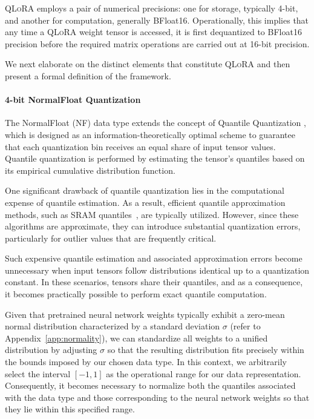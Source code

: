 \textsc{QLoRA} employs a pair of numerical precisions: one for storage, typically 4-bit, and another for computation, generally BFloat16. Operationally, this implies that any time a \textsc{QLoRA} weight tensor is accessed, it is first dequantized to BFloat16 precision before the required matrix operations are carried out at 16-bit precision.

We next elaborate on the distinct elements that constitute \textsc{QLoRA} and then present a formal definition of the framework.

\paragraph{4-bit NormalFloat Quantization} The NormalFloat (NF) data type extends the concept of Quantile Quantization \citep{dettmers2022optimizers}, which is designed as an information-theoretically optimal scheme to guarantee that each quantization bin receives an equal share of input tensor values. Quantile quantization is performed by estimating the tensor's quantiles based on its empirical cumulative distribution function.

One significant drawback of quantile quantization lies in the computational expense of quantile estimation. As a result, efficient quantile approximation methods, such as SRAM quantiles~\citep{dettmers2022optimizers}, are typically utilized. However, since these algorithms are approximate, they can introduce substantial quantization errors, particularly for outlier values that are frequently critical.

Such expensive quantile estimation and associated approximation errors become unnecessary when input tensors follow distributions identical up to a quantization constant. In these scenarios, tensors share their quantiles, and as a consequence, it becomes practically possible to perform exact quantile computation.

Given that pretrained neural network weights typically exhibit a zero-mean normal distribution characterized by a standard deviation $\sigma$ (refer to Appendix~\ref{app:normality}), we can standardize all weights to a unified distribution by adjusting $\sigma$ so that the resulting distribution fits precisely within the bounds imposed by our chosen data type. In this context, we arbitrarily select the interval $[-1, 1]$ as the operational range for our data representation. Consequently, it becomes necessary to normalize both the quantiles associated with the data type and those corresponding to the neural network weights so that they lie within this specified range.

